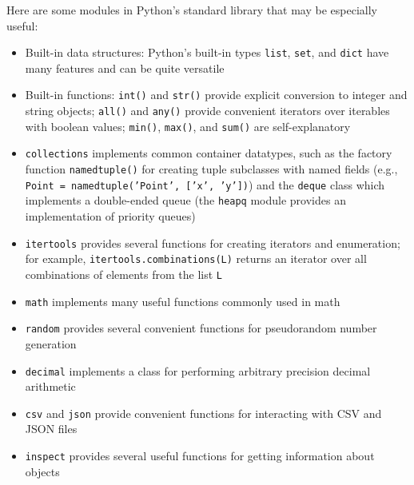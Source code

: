 \documentclass[12pt]{article}
\begin{document}
Here are some modules in Python's standard library that may be especially useful:
\begin{itemize}
    \item Built-in data structures: Python's built-in types \texttt{list}, \texttt{set}, and \texttt{dict} have many features and can be quite versatile
    \item Built-in functions: \texttt{int()} and \texttt{str()} provide explicit conversion to integer and string objects; \texttt{all()} and \texttt{any()} provide convenient iterators over iterables with boolean values; \texttt{min()}, \texttt{max()}, and \texttt{sum()} are self-explanatory
    \item \texttt{collections} implements common container datatypes, such as the factory function \texttt{namedtuple()} for creating tuple subclasses with named fields (e.g., \texttt{Point = namedtuple('Point', ['x', 'y'])}) and the \texttt{deque} class which implements a double-ended queue (the \texttt{heapq} module provides an implementation of priority queues)
    \item \texttt{itertools} provides several functions for creating iterators and enumeration; for example, \texttt{itertools.combinations(L)} returns an iterator over all combinations of elements from the list \texttt{L}
    \item \texttt{math} implements many useful functions commonly used in math
    \item \texttt{random} provides several convenient functions for pseudorandom number generation
    \item \texttt{decimal} implements a class for performing arbitrary precision decimal arithmetic
    \item \texttt{csv} and \texttt{json} provide convenient functions for interacting with CSV and JSON files
    \item \texttt{inspect} provides several useful functions for getting information about objects
\end{itemize}
\end{document}
